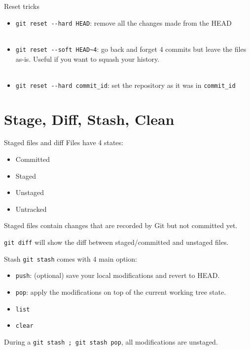 \documentclass[usenames,dvipsnames,9pt]{beamer}
\begin{document}
%
\begin{frame}{Reset tricks}
  \begin{itemize}
    \item \lstinline|git reset --hard HEAD|: remove all the changes made from the HEAD\\~\\
    \item \lstinline|git reset --soft HEAD~4|: go back and forget 4 commits but leave the files as-is. Useful if you want to squash your history.\\~\\
    \item \lstinline|git reset --hard commit_id|: set the repository as it was in \lstinline|commit_id|
  \end{itemize}
\end{frame}



\section{Stage, Diff, Stash, Clean}

%
\begin{frame}{Staged files and diff}
  Files have 4 states:
  \begin{itemize}
    \item Committed
    \item Staged
    \item Unstaged
    \item Untracked
  \end{itemize}
  Staged files contain changes that are recorded by Git but not committed yet.

  \lstinline|git diff| will show the diff between staged/committed and unstaged files.
\end{frame}

%
\begin{frame}{Stash}
  \lstinline|git stash| comes with 4 main option:
  \begin{itemize}
    \item \lstinline|push|: (optional) save your local modifications and revert to HEAD.
    \item \lstinline|pop|: apply the modifications on top of the current working tree state.
    \item \lstinline|list|
    \item \lstinline|clear|
  \end{itemize}

  \vspace{0.5cm}
  During a \lstinline|git stash ; git stash pop|, all modifications are unstaged.
\end{frame}
\end{document}

